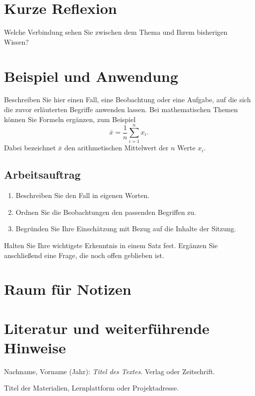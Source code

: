 \documentclass[11pt,a4paper,parskip=half]{scrartcl}
\begin{document}
\section{Kurze Reflexion}
Welche Verbindung sehen Sie zwischen dem Thema und Ihrem bisherigen Wissen?
\notizlinien[2]

\newpage

\section{Beispiel und Anwendung}
Beschreiben Sie hier einen Fall, eine Beobachtung oder eine Aufgabe,
auf die sich die zuvor erläuterten Begriffe anwenden lassen.
Bei mathematischen Themen können Sie Formeln ergänzen, zum Beispiel
\[
  \bar{x}=\frac{1}{n}\sum_{i=1}^{n}x_i.
\]
Dabei bezeichnet $\bar{x}$ den arithmetischen Mittelwert der $n$ Werte $x_i$.

\subsection{Arbeitsauftrag}
\begin{enumerate}
  \item Beschreiben Sie den Fall in eigenen Worten.
  \item Ordnen Sie die Beobachtungen den passenden Begriffen zu.
  \item Begründen Sie Ihre Einschätzung mit Bezug auf die Inhalte der Sitzung.
\end{enumerate}

\begin{merksatz}[Ergebnissicherung]
Halten Sie Ihre wichtigste Erkenntnis in einem Satz fest. Ergänzen Sie
anschließend eine Frage, die noch offen geblieben ist.
\end{merksatz}

\section{Raum für Notizen}
\notizlinien[6]

\section{Literatur und weiterführende Hinweise}
\begin{description}[font=\normalfont\bfseries,style=nextline]
  \item[Grundlagentext]
    Nachname, Vorname (Jahr): \emph{Titel des Textes}. Verlag oder Zeitschrift.
  \item[Materialien zur Sitzung]
    Titel der Materialien, Lernplattform oder Projektadresse.
\end{description}
\end{document}
